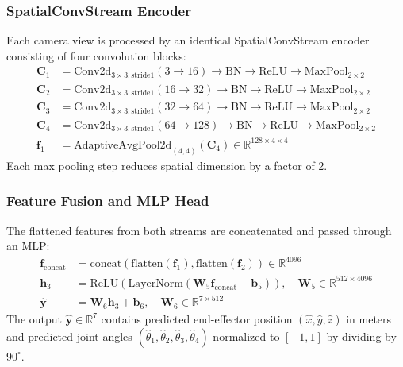 \documentclass[12pt,a4paper,oneside]{report}
\begin{document}
\subsubsection{SpatialConvStream Encoder}

Each camera view is processed by an identical SpatialConvStream encoder consisting of four convolution blocks:
\begin{align}
\mathbf{C}_1 &= \text{Conv2d}_{3\times3,\text{stride}1}(3 \rightarrow 16) \rightarrow \text{BN} \rightarrow \text{ReLU} \rightarrow \text{MaxPool}_{2\times2} \\
\mathbf{C}_2 &= \text{Conv2d}_{3\times3,\text{stride}1}(16 \rightarrow 32) \rightarrow \text{BN} \rightarrow \text{ReLU} \rightarrow \text{MaxPool}_{2\times2} \\
\mathbf{C}_3 &= \text{Conv2d}_{3\times3,\text{stride}1}(32 \rightarrow 64) \rightarrow \text{BN} \rightarrow \text{ReLU} \rightarrow \text{MaxPool}_{2\times2} \\
\mathbf{C}_4 &= \text{Conv2d}_{3\times3,\text{stride}1}(64 \rightarrow 128) \rightarrow \text{BN} \rightarrow \text{ReLU} \rightarrow \text{MaxPool}_{2\times2} \\
\mathbf{f}_1 &= \text{AdaptiveAvgPool2d}_{(4,4)}(\mathbf{C}_4) \in \mathbb{R}^{128 \times 4 \times 4}
\end{align}
Each max pooling step reduces spatial dimension by a factor of 2.

\subsubsection{Feature Fusion and MLP Head}

The flattened features from both streams are concatenated and passed through an MLP:
\begin{align}
\mathbf{f}_{\text{concat}} &= \text{concat}(\text{flatten}(\mathbf{f}_1), \text{flatten}(\mathbf{f}_2)) \in \mathbb{R}^{4096} \\
\mathbf{h}_3 &= \text{ReLU}(\text{LayerNorm}(\mathbf{W}_5 \mathbf{f}_{\text{concat}} + \mathbf{b}_5)), \quad \mathbf{W}_5 \in \mathbb{R}^{512 \times 4096} \\
\hat{\mathbf{y}} &= \mathbf{W}_6 \mathbf{h}_3 + \mathbf{b}_6, \quad \mathbf{W}_6 \in \mathbb{R}^{7 \times 512}
\end{align}
The output $\hat{\mathbf{y}} \in \mathbb{R}^7$ contains predicted end-effector position $(\hat{x}, \hat{y}, \hat{z})$ in meters and predicted joint angles $(\hat{\theta}_1, \hat{\theta}_2, \hat{\theta}_3, \hat{\theta}_4)$ normalized to $[-1, 1]$ by dividing by $90^\circ$.
\end{document}
